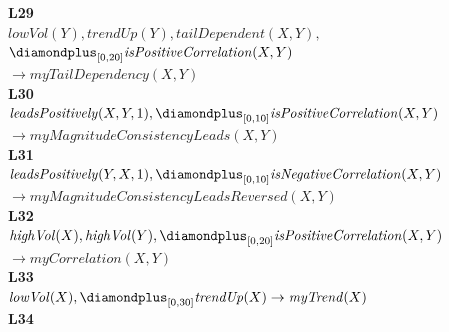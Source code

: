 \begin{figure}[t]
{\begin{minipage}{0.95\textwidth}
\textbf{L29}\\
\hspace*{1.5em}\mbox{$\mathit{lowVol}(Y), \mathit{trendUp}(Y), \mathit{tailDependent}(X,Y),$}\\
\hspace*{1.5em}\hspace*{1.5em}\mbox{$\diamondplus_{[0,20]} \mathit{isPositiveCorrelation}(X,Y)$}\\
\hspace*{1.5em}\hspace*{3em}\mbox{$\to \mathit{myTailDependency}(X,Y)$}\\[4pt]
\textbf{L30}\\
\hspace*{1.5em}\mbox{$\mathit{leadsPositively}(X,Y,1), \diamondplus_{[0,10]} \mathit{isPositiveCorrelation}(X,Y)$}\\
\hspace*{1.5em}\hspace*{3em}\mbox{$\to \mathit{myMagnitudeConsistencyLeads}(X,Y)$}\\[4pt]
\textbf{L31}\\
\hspace*{1.5em}\mbox{$\mathit{leadsPositively}(Y,X,1), \diamondplus_{[0,10]} \mathit{isNegativeCorrelation}(X,Y)$}\\
\hspace*{1.5em}\hspace*{3em}\mbox{$\to \mathit{myMagnitudeConsistencyLeadsReversed}(X,Y)$}\\[4pt]
\textbf{L32}\\
\hspace*{1.5em}\mbox{$\mathit{highVol}(X), \mathit{highVol}(Y), \diamondplus_{[0,20]} \mathit{isPositiveCorrelation}(X,Y)$}\\
\hspace*{1.5em}\hspace*{3em}\mbox{$\to \mathit{myCorrelation}(X,Y)$}\\[4pt]
\textbf{L33}\\
\hspace*{1.5em}\mbox{$\mathit{lowVol}(X), \diamondplus_{[0,30]} \mathit{trendUp}(X) \to \mathit{myTrend}(X)$}\\[4pt]
\textbf{L34}\\

\end{minipage}}
\end{figure}
